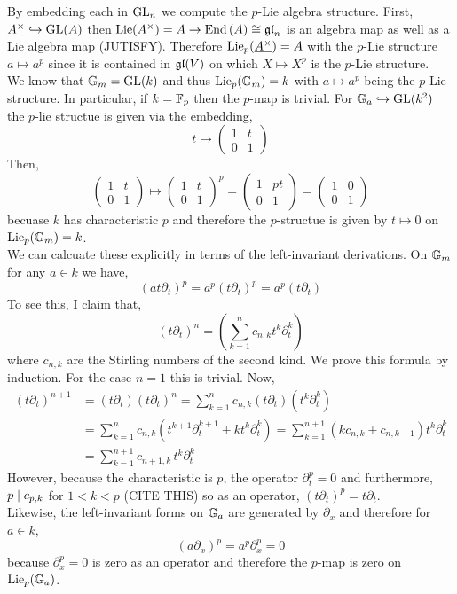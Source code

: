 \documentclass[12pt]{article}
\begin{document}
By embedding each in $\mathrm{GL}_n$ 
we compute the $p$-Lie algebra structure. First, $\underline{A^\times} \hookrightarrow \mathrm{GL}(A)$ then $\mathrm{Lie}(\underline{A^\times}) = A \to \mathrm{End}\left( A \right) \cong \mathfrak{gl}_n$ is an algebra map as well as a Lie algebra map (JUTISFY). Therefore $\mathrm{Lie}_p(\underline{A^\times}) = A$ with the $p$-Lie structure $a \mapsto a^p$ since it is contained in $\mathfrak{gl}(V)$ on which $X \mapsto X^p$ is the $p$-Lie structure.
\bigskip\\
We know that ${\mathbb{G}_m} = \mathrm{GL}(k)$ and thus $\mathrm{Lie}_p({\mathbb{G}_m}) = k$ with $a \mapsto a^p$ being the $p$-Lie structure. In particular, if $k = \mathbb{F}_p$ then the $p$-map is trivial. For ${\mathbb{G}_a} \hookrightarrow \mathrm{GL}(k^2)$ the $p$-lie structue is given via the embedding,
\[ t \mapsto 
\begin{pmatrix}
1 & t 
\\
0 & 1
\end{pmatrix} \]
Then,
\[ \begin{pmatrix}
1 & t
\\
0 & 1
\end{pmatrix}
\mapsto 
\begin{pmatrix}
1 & t
\\
0 & 1
\end{pmatrix}^p
= \begin{pmatrix}
1 & pt
\\
0 & 1
\end{pmatrix}
= \begin{pmatrix}
1 & 0
\\
0 & 1
\end{pmatrix} \]
becuase $k$ has characteristic $p$ and therefore the $p$-structue is given by $t \mapsto 0$ on $\mathrm{Lie}_p({\mathbb{G}_m}) = k$. 
\bigskip\\
We can calcuate these explicitly in terms of the left-invariant derivations. On ${\mathbb{G}_m}$ for any $a \in k$ we have,
\[ (a t \partial_t)^p = a^p (t \partial_t)^p = a^p (t \partial_t) \]
To see this, I claim that,
\[ (t \partial_t)^n = \left( \sum_{k = 1}^n c_{n,k} t^k \partial_t^k  \right) \]
where $c_{n,k}$ are the Stirling numbers of the second kind. We prove this formula by induction. For the case $n = 1$ this is trivial. Now,
\begin{align*}
(t \partial_t)^{n+1} & = (t \partial_t) (t \partial_t)^n = \sum_{k = 1}^n c_{n,k} (t \partial_t) (t^k \partial^k_t) 
\\
& = \sum_{k = 1}^n c_{n,k} (t^{k+1} \partial_t^{k+1} + k t^k \partial_t^k) = \sum_{k = 1}^{n+1} (k c_{n,k} + c_{n,k-1}) t^k \partial_t^k
\\
& = \sum_{k = 1}^{n+1} c_{n+1,k} \, t^k \partial_t^k
\end{align*} 
However, because the characteristic is $p$, the operator $\partial_t^p = 0$ and furthermore, $p \mid c_{p,k}$ for $1 < k < p$ (CITE THIS) so as an operator, $(t \partial_t)^p = t \partial_t$.
\bigskip\\
Likewise, the left-invariant forms on ${\mathbb{G}_a}$ are generated by $\partial_x$ and therefore for $a \in k$,
\[ (a \partial_x)^p = a^p \partial_x^p = 0 \]
because $\partial_x^p = 0$ is zero as an operator and therefore the $p$-map is zero on $\mathrm{Lie}_p({\mathbb{G}_a})$.
\end{document}
